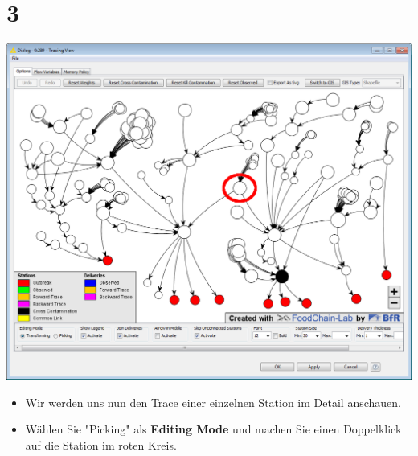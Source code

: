 \documentclass{beamer}
\begin{document}
\section{3}
\begin{frame}
	\begin{center}
  		\includegraphics[height=0.6\textheight]{3.png}
	\end{center}
	\begin{itemize}
		\item Wir werden uns nun den Trace einer einzelnen Station im Detail anschauen.
		\item Wählen Sie "Picking" als \textbf{Editing Mode} und machen Sie einen Doppelklick auf die Station im roten Kreis.
	\end{itemize}
\end{frame}
\end{document}
